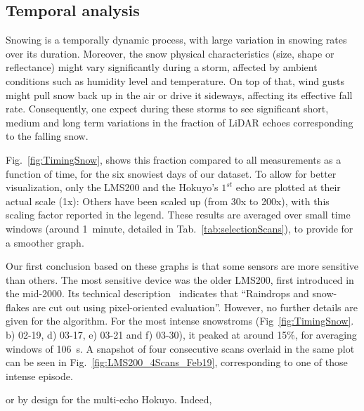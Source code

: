 
\subsection{Temporal analysis}
Snowing is a temporally dynamic process, with large variation in snowing rates over its duration. Moreover, the snow physical characteristics (size, shape or reflectance) might vary significantly during a storm, affected by ambient conditions such as humidity level and temperature. On top of that, wind gusts might pull snow back up in the air or drive it sideways, affecting its effective fall rate. Consequently, one expect during these storms to see significant short, medium and long term variations in the fraction of LiDAR echoes corresponding to the falling snow.

Fig.~\ref{fig:TimingSnow}, shows this fraction compared to all measurements as a function of time, for the six snowiest days of our dataset. To allow for better visualization, only the LMS200 and the Hokuyo's $1^{st}$ echo are plotted at their actual scale (1x): Others have been scaled up (from 30x to 200x), with this scaling factor reported in the legend. These results are averaged over small time windows (around 1~minute, detailed in Tab.~\ref{tab:selectionScans}), to provide for a smoother graph.

Our first conclusion based on these graphs is that some sensors are more sensitive than others. The most sensitive device was the older LMS200, first introduced in the mid-2000. Its technical description~\cite{LMS200Manual} indicates that ``Raindrops and snow-flakes are cut out using pixel-oriented evaluation''. However, no further details are given for the algorithm. For the most intense snowstroms (Fig~\ref{fig:TimingSnow}. b) 02-19, d) 03-17, e) 03-21 and f) 03-30), it peaked at around 15\%, for averaging windows of \SI{106}{\second}. A snapshot of four consecutive scans overlaid in the same plot can be seen in Fig.~\ref{fig:LMS200_4Scans_Feb19}, corresponding to one of those intense episode.

or by design for the multi-echo Hokuyo. Indeed, 

